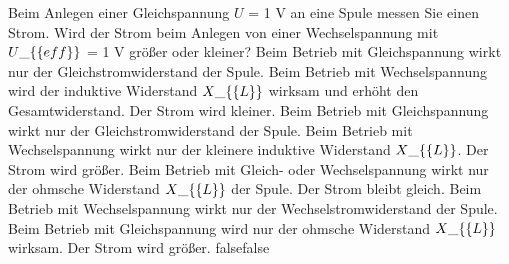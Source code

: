     {Beim Anlegen einer Gleichspannung $U$ = 1 V an eine Spule messen Sie einen Strom. Wird der Strom beim Anlegen von einer Wechselspannung mit $U\_\{\textrm\{eff\}\}$ = 1 V größer oder kleiner?}
    {Beim Betrieb mit Gleichspannung wirkt nur der Gleichstromwiderstand der Spule. Beim Betrieb mit Wechselspannung wird der induktive Widerstand $X\_\{\textrm\{L\}\}$ wirksam und erhöht den Gesamtwiderstand. Der Strom wird kleiner.}
    {Beim Betrieb mit Gleichspannung wirkt nur der Gleichstromwiderstand der Spule. Beim Betrieb mit Wechselspannung wirkt nur der kleinere induktive Widerstand $X\_\{\textrm\{L\}\}$. Der Strom wird größer.}
    {Beim Betrieb mit Gleich- oder Wechselspannung wirkt nur der ohmsche Widerstand $X\_\{\textrm\{L\}\}$ der Spule. Der Strom bleibt gleich.}
    {Beim Betrieb mit Wechselspannung wirkt nur der Wechselstromwiderstand der Spule. Beim Betrieb mit Gleichspannung wird nur der ohmsche Widerstand $X\_\{\textrm\{L\}\}$ wirksam. Der Strom wird größer.}
    {false}{false}